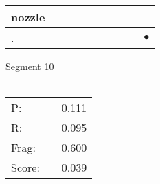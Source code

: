 \documentclass[landscape]{article}
\newcommand{\ssp}{\hspace{2pt}}
\newcommand{\mex}{\cellcolor{g}$\bullet$}
\begin{document}
\begin{tabular}{|l|p{10pt}|p{10pt}|p{10pt}|p{10pt}|p{10pt}|p{10pt}|p{10pt}|p{10pt}|p{10pt}|}
\hline
\ssp nozzle \ssp&\hspace{2pt}&\hspace{2pt}&\hspace{2pt}&\hspace{2pt}&\hspace{2pt}&\hspace{2pt}&\hspace{2pt}&\hspace{2pt}&\hspace{2pt}\\
\hline
\ssp \cellcolor{ref8}. \ssp&\hspace{2pt}&\hspace{2pt}&\hspace{2pt}&\hspace{2pt}&\hspace{2pt}&\hspace{2pt}&\hspace{2pt}&\hspace{2pt}&\hspace{2pt}\mex\\
\hline
\end{tabular}

\vspace{6pt}
\noindent Segment 10\\\\
\noindent\begin{tabular}{lm{12pt}r}
\hline
P:&&0.111\\
R:&&0.095\\
Frag:&&0.600\\
Score:&&0.039\\
\end{tabular}

\newpage
\end{document}
